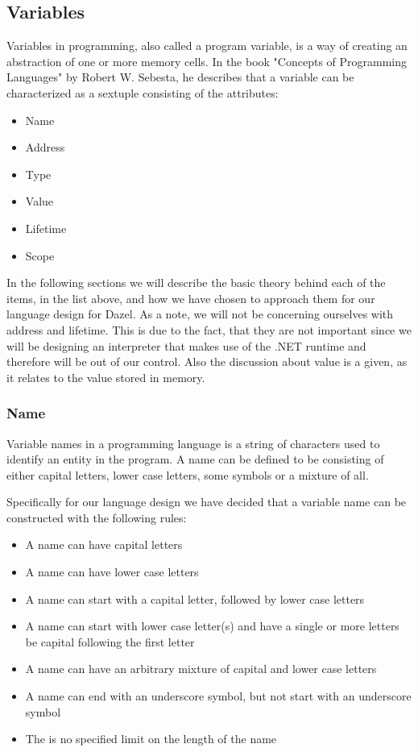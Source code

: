 \subsection{Variables}

Variables in programming, also called a program variable, is a way of creating an abstraction of one or more memory cells. In the book "Concepts of Programming Languages" by
Robert W. Sebesta\cite{sebesta_concepts_2016}, he describes that a variable can be characterized as a sextuple consisting of the attributes:

\begin{itemize}
    \item Name
    \item Address
    \item Type
    \item Value
    \item Lifetime
    \item Scope
\end{itemize}

In the following sections we will describe the basic theory behind each of the items, in the list above, and how we have chosen to approach them for our language design for Dazel.
As a note, we will not be concerning ourselves with address and lifetime. This is due to the fact, that they are not important since we will be designing an interpreter that makes use of the .NET runtime 
and therefore will be out of our control.
Also the discussion about value is a given, as it relates to the value stored in memory\cite{sebesta_concepts_2016}.


\subsubsection{Name}

Variable names in a programming language is a string of characters used to identify an entity in the program\cite{sebesta_concepts_2016}. A name can be defined to be consisting of either capital letters, 
lower case letters, some symbols or a mixture of all.

Specifically for our language design we have decided that a variable name can be constructed with the following rules:

\begin{itemize}
    \item A name can have capital letters
    \item A name can have lower case letters
    \item A name can start with a capital letter, followed by lower case letters
    \item A name can start with lower case letter(s) and have a single or more letters be capital following the first letter
    \item A name can have an arbitrary mixture of capital and lower case letters
    \item A name can end with an underscore symbol, but not start with an underscore symbol
    \item The is no specified limit on the length of the name
\end{itemize}

